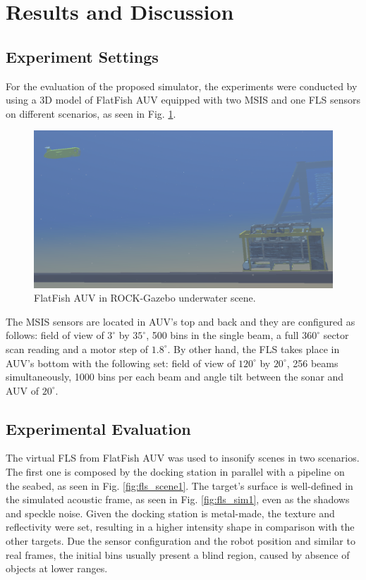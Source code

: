 \documentclass[final,5p,times]{elsarticle}
\begin{document}
\section{Results and Discussion}
\label{results}

\subsection{Experiment Settings}

For the evaluation of the proposed simulator, the experiments were conducted by using a 3D model of FlatFish AUV equipped with two MSIS and one FLS sensors on different scenarios, as seen in Fig. \ref{fig:uwscene}.

\begin{figure}[!h]
    \includegraphics[width=\columnwidth]{figs/uwscene2}
    \centering
    \captionsetup{justification=centering}
    \caption{FlatFish AUV in ROCK-Gazebo underwater scene.}
    \label{fig:uwscene}
\end{figure}

The MSIS sensors are located in AUV's top and back and they are configured as follows: field of view of $3^{\circ}$ by $35^{\circ}$, 500 bins in the single beam, a full $360^{\circ}$ sector scan reading and a motor step of $1.8^{\circ}$. By other hand, the FLS takes place in AUV's bottom with the following set: field of view of $120^{\circ}$ by $20^{\circ}$, 256 beams simultaneously, 1000 bins per each beam and angle tilt between the sonar and AUV of $20^{\circ}$.

\subsection{Experimental Evaluation}

The virtual FLS from FlatFish AUV was used to insonify scenes in two scenarios. The first one is composed by the docking station in parallel with a pipeline on the seabed, as seen in Fig. \ref{fig:fls_scene1}. The target's surface is well-defined in the simulated acoustic frame, as seen in Fig. \ref{fig:fls_sim1}, even as the shadows and speckle noise. Given the docking station is metal-made, the texture and reflectivity were set, resulting in a higher intensity shape in comparison with the other targets. Due the sensor configuration and the robot position and similar to real frames, the initial bins usually present a blind region, caused by absence of objects at lower ranges.
\end{document}
